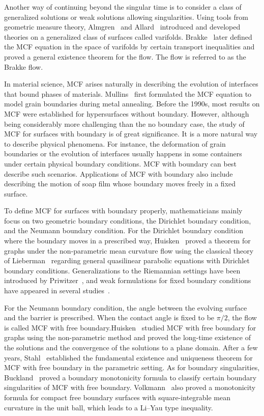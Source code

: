 Another way of continuing beyond the singular time is to consider a class of generalized solutions or weak solutions allowing singularities. Using tools from geometric measure theory, Almgren~\cite{almgren_plateaus_1966} and Allard~\cite{allard_first_1972} introduced and developed theories on a generalized class of surfaces called varifolds. Brakke~\cite{Brakke_1978} later defined the MCF equation in the space of varifolds by certain transport inequalities and proved a general existence theorem for the flow. The flow is referred to as the Brakke flow.

In material science, MCF arises naturally in describing the evolution of interfaces that bound phases of materials. Mullins~\cite{mullins_twodimensional_1956} first formulated the MCF equation to model grain boundaries during metal annealing. Before the 1990s, most results on MCF were established for hypersurfaces without boundary. However, although being considerably more challenging than the no boundary case, the study of MCF for surfaces with boundary is of great significance. It is a more natural way to describe physical phenomena. For instance, the deformation of grain boundaries or the evolution of interfaces usually happens in some containers under certain physical boundary conditions. MCF with boundary can best describe such scenarios. Applications of MCF with boundary also include describing the motion of soap film whose boundary moves freely in a fixed surface.

To define MCF for surfaces with boundary properly, mathematicians mainly focus on two geometric boundary conditions, the Dirichlet boundary condition, and the Neumann boundary condition. For the Dirichlet boundary condition where the boundary moves in a prescribed way, Huisken~\cite{huisken_non-parametric_1989} proved a theorem for graphs under the non-parametric mean curvature flow using the classical theory of Lieberman~\cite{Lieberman_1986} regarding general quasilinear parabolic equations with Dirichlet boundary conditions. Generalizations to the Riemannian settings have been introduced by Priwitzer~\cite{priwitzer_mean_2003}, and weak formulations for fixed boundary conditions have appeared in several studies~\cite{stuvard_existence_2021,white2021mean}.

For the Neumann boundary condition, the angle between the evolving surface and the barrier is prescribed. When the contact angle is fixed to be $\pi/2$, the flow is called MCF with free boundary.Huisken~\cite{huisken_non-parametric_1989} studied MCF with free boundary for graphs using the non-parametric method and proved the long-time existence of the solutions and the convergence of the solutions to a plane domain. After a few years, Stahl~\cite{stahl_regularity_1996} established the fundamental existence and uniqueness theorem for MCF with free boundary in the parametric setting. As for boundary singularities, Buckland~\cite{buckland_mean_2005} proved a boundary monotonicity formula to classify certain boundary singularities of MCF with free boundary. Volkmann~\cite{volkmann_monotonicity_2016} also proved a monotonicity formula for compact free boundary surfaces with square-integrable mean curvature in the unit ball, which leads to a Li--Yau type inequality.

